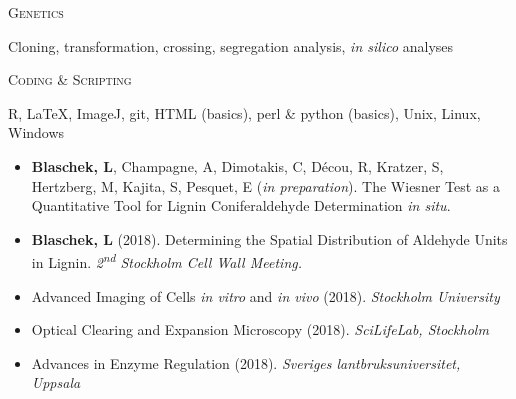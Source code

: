\documentclass[11pt]{article}
\begin{document}
\pagebreak

\textsc{\large{Genetics}} 
\begin{addmargin}[24pt]{0pt}
	Cloning, transformation, crossing, segregation analysis, \textit{in silico} analyses
\end{addmargin}	
\vspace{0.2cm}

\textsc{\large{Coding \& Scripting}}
\begin{addmargin}[24pt]{0pt}
	R, LaTeX, ImageJ, git, HTML (basics), perl \& python (basics), Unix, Linux, Windows
\vspace{1cm}
\end{addmargin}

	\begin{itemize}[label={},itemindent=-9pt,leftmargin=24pt]
	\item \textbf{Blaschek, L}, Champagne, A, Dimotakis, C, Décou, R, Kratzer, S, Hertzberg, M, Kajita, S, Pesquet, E (\textit{in preparation}). The Wiesner Test as a Quantitative Tool for Lignin Coniferaldehyde Determination \textit{in situ}.
	\end{itemize}
\vspace{1cm}

	\begin{itemize}[label={},itemindent=-9pt,leftmargin=24pt]
	\item \textbf{Blaschek, L} (2018). Determining the Spatial Distribution of Aldehyde Units in Lignin. \textit{2\textsuperscript{nd} Stockholm Cell Wall Meeting.}
	\end{itemize}
\vspace{1cm}

\begin{itemize}[label={},itemindent=-9pt,leftmargin=24pt]
	\item Advanced Imaging of Cells \textit{in vitro} and \textit{in vivo} (2018). \textit{Stockholm University} 
	\item Optical Clearing and Expansion Microscopy (2018). \textit{SciLifeLab, Stockholm} 	
	\item Advances in Enzyme Regulation (2018). \textit{Sveriges lantbruksuniversitet, Uppsala} 
\end{itemize}
\end{document}

